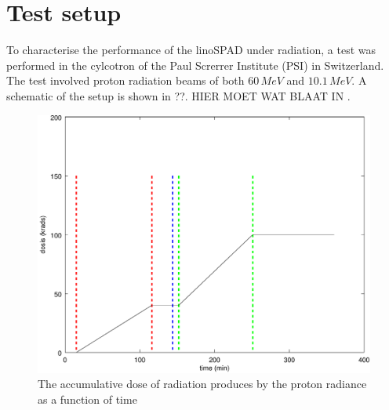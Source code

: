\section{Test setup}\label{ssec:test_setup}
To characterise the performance of the linoSPAD under radiation, a test was performed in the cylcotron of the Paul Screrrer Institute (PSI) in Switzerland. The test involved proton radiation beams of both $60\,MeV$ and $10.1\,MeV$. A schematic of the setup is shown in ??. HIER MOET WAT BLAAT IN
.






\begin{figure}[h]
\centering
	\includegraphics[width=0.6\linewidth]{fig/dosis.pdf}
\caption{The accumulative dose of radiation produces by the proton radiance as a function of time}
\label{fig:dosis}
\end{figure}


